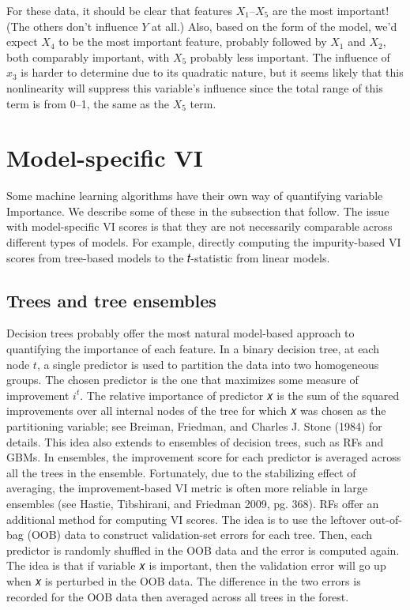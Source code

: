 For these data, it should be clear that features $X_1$--$X_5$ are the most important! (The others don't influence $Y$ at all.) Also, based on the form of the model, we'd expect $X_4$ to be the most important feature, probably followed by $X_1$ and $X_2$, both comparably important, with $X_5$ probably less important. The influence of $x_3$ is harder to determine due to its quadratic nature, but it seems likely that this nonlinearity will suppress this variable's influence since the total range of this term is from 0--1, the same as the $X_5$ term.


\section{Model-specific VI}

Some machine learning algorithms have their own way of quantifying variable Importance. We describe some of these in the subsection that follow. The issue with model-specific VI scores is that they are not necessarily comparable across different types of models. For example, directly computing the impurity-based VI scores from tree-based models to the 𝑡-statistic from linear models.

\subsection{Trees and tree ensembles}

Decision trees probably offer the most natural model-based approach to quantifying the importance of each feature. In a binary decision tree, at each node $t$, a single predictor is used to partition the data into two homogeneous groups. The chosen predictor is the one that maximizes some measure of improvement $i^t$. The relative importance of predictor 𝑥 is the sum of the squared improvements over all internal nodes of the tree for which 𝑥 was chosen as the partitioning variable; see Breiman, Friedman, and Charles J. Stone (1984) for details. This idea also extends to ensembles of decision trees, such as RFs and GBMs. In ensembles, the improvement score for each predictor is averaged across all the trees in the ensemble. Fortunately, due to the stabilizing effect of averaging, the improvement-based VI metric is often more reliable in large ensembles (see Hastie, Tibshirani, and Friedman 2009, pg. 368). RFs offer an additional method for computing VI scores. The idea is to use the leftover out-of-bag (OOB) data to construct validation-set errors for each tree. Then, each predictor is randomly shuffled in the OOB data and the error is computed again. The idea is that if variable 𝑥 is important, then the validation error will go up when 𝑥 is perturbed in the OOB data. The difference in the two errors is recorded for the OOB data then averaged across all trees in the forest.

